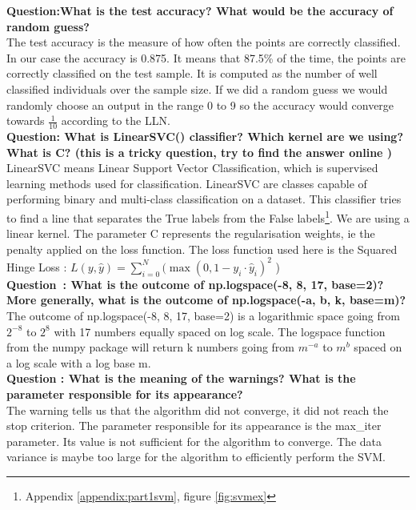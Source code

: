 \textbf{{Question}:What is the test accuracy? What would be the accuracy of random guess?} \\

The test accuracy is the measure of how often the points are correctly classified. In our case the accuracy is 0.875.  It means that 87.5\% of the time, the points are correctly classified on the test sample. It is computed as the number of well classified individuals over the sample size. If we did a random guess we would randomly choose an output in the range 0 to 9 so the accuracy would converge towards $\frac{1}{10}$ according to the LLN.  \\


\textbf{{Question}:  What is LinearSVC() classifier? Which kernel are we using? What is C? (this is a tricky question, try to find the answer online )}\\

LinearSVC means Linear Support Vector Classification, which is supervised learning methods used for classification. LinearSVC are classes capable of performing binary and multi-class classification on a dataset. 
This classifier tries to find a line that separates the True labels from the False labels\footnote{Appendix \ref{appendix:part1svm}, figure \ref{fig:svmex}}. We are using a linear kernel. The parameter C represents the regularisation weights, ie the penalty applied on the loss function. The loss function used here is the Squared Hinge Loss : $L(y, \hat y)=\sum^N_{i=0}(\max(0,1-y_i\cdot \hat y_i)^2$ )\\


\textbf{{Question} : What is the outcome of np.logspace(-8, 8, 17, base=2)? More generally, what is the outcome of np.logspace(-a, b, k, base=m)?}\\

The outcome of np.logspace(-8, 8, 17, base=2) is a logarithmic space going from $2^{-8}$ to $2^8$ with 17 numbers equally spaced on log scale.
 The logspace function from the numpy package will return k numbers going from $m^{-a}$ to $m^b$ spaced on a log scale with a log base m. \\

\textbf{Question : What is the meaning of the warnings? What is the parameter responsible for its appearance?}\\

The warning tells us that the algorithm did not converge, it did not reach the stop criterion. The parameter responsible for its appearance is the max\_iter parameter. Its value is not sufficient for the algorithm to converge. The data variance is maybe too large for the algorithm to efficiently perform the SVM. \\

